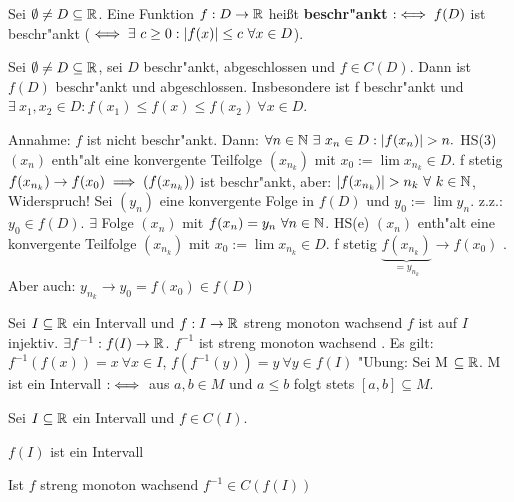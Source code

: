 \documentclass[a4paper,twoside,DIV15,BCOR12mm]{scrbook}
\begin{document}
\begin{definition*}
Sei $\emptyset \ne D \subseteq \mathbb{R}$. Eine Funktion $f: D\to\mathbb{R}$ heißt \textbf{beschr"ankt} $:\iff f(D)$ ist beschr"ankt ($\iff \exists\ c \ge 0 : |f(x)| \le c\ \forall x \in D$).
\end{definition*}

\begin{satz}
Sei $\emptyset \ne D \subseteq \mathbb{R}$, sei $D$ beschr"ankt, abgeschlossen und $f \in C(D)$. Dann ist $f(D)$ beschr"ankt und abgeschlossen. Insbesondere ist f beschr"ankt und $\exists\ x_1, x_2 \in D : f(x_1) \le f(x) \le f(x_2)\ \forall x \in D$.
\end{satz}

\begin{beweis}
Annahme: $f$ ist nicht beschr"ankt. Dann: $\forall n \in \mathbb{N}\ \exists\ x_n \in D: |f(x_n)| > n.$ HS(3) \folgt $(x_n)$ enth"alt eine konvergente Teilfolge $(x_{n_k})$ mit $x_0:=\lim x_{n_k} \in D$. f stetig \folgt $f(x_{n_k}) \to f(x_0) \implies (f(x_{n_k}))$ ist beschr"ankt, aber: $|f(x_{n_k})| > n_k\ \forall\ k \in \mathbb{N}$, Widerspruch! Sei $(y_n)$ eine konvergente Folge in $f(D)$ und $y_0:=\lim y_n$. z.z.: $y_0 \in f(D)$. $\exists$ Folge $(x_n)$ mit $f(x_n)=y_n\ \forall n \in \mathbb{N}$. HS(e) \folgt $(x_n)$ enth"alt eine konvergente Teilfolge $(x_{n_k})$ mit $x_0:=\lim x_{n_k} \in D$. f stetig \folgt $\underbrace{f(x_{n_k})}_{=y_{n_k}} \to f(x_0)$ . Aber auch: $y_{n_k} \to y_0 = f(x_0) \in f(D)$
\end{beweis}

Sei $I \subseteq \mathbb{R}$ ein Intervall und $f: I \to \mathbb{R}$ streng monoton wachsend  \folgt $f$ ist auf $I$ injektiv. \folgt $\exists f^{-1}: f(I) \to \mathbb{R}$. $f^{-1}$ ist streng monoton wachsend . Es gilt: $f^{-1}(f(x)) = x\ \forall x \in I$, $f(f^{-1}(y)) = y\ \forall y \in f(I)$ "Ubung: Sei M $\subseteq \mathbb{R}$. M ist ein Intervall $:\iff$ aus $a, b \in M$ und $a \le b$ folgt stets $[a, b] \subseteq M$.

\begin{satz}
Sei $I \subseteq \mathbb{R}$ ein Intervall und $f \in C(I)$.
\begin{liste}
\item $f(I)$ ist ein Intervall
\item Ist $f$ streng monoton wachsend  \folgt $f^{-1} \in C(f(I))$
\end{liste}
\end{satz}
\end{document}
